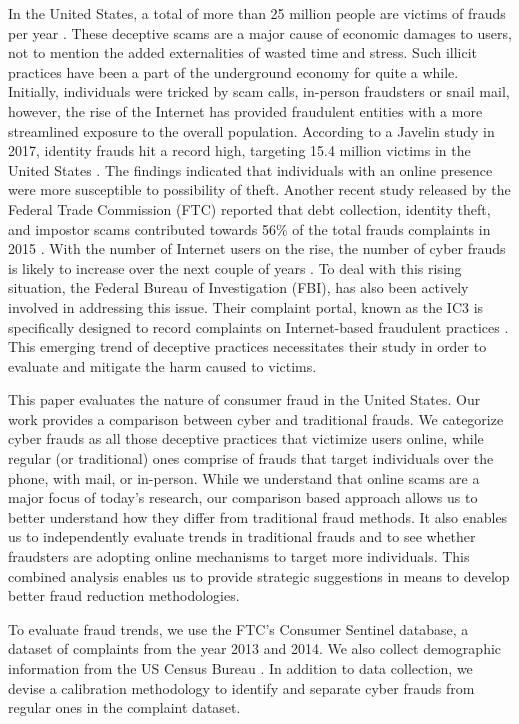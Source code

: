 \documentclass[conference]{IEEEtran}
\begin{document}
In the United States, a total of more than 25 million people are victims of frauds per year \cite{anderson2013consumer}. These deceptive scams are a major cause of economic damages to users, not to mention the added externalities of wasted time and stress. Such illicit practices have been a part of the underground economy for quite a while. Initially, individuals were tricked by scam calls, in-person fraudsters or snail mail, however, the rise of the Internet has provided fraudulent entities with a more streamlined exposure to the overall population. According to a Javelin study in 2017, identity frauds hit a record high, targeting 15.4 million victims in the United States \cite{identiytheftonline}. The findings indicated that individuals with an online presence were more susceptible to possibility of theft. Another recent study released by the  Federal Trade Commission (FTC) reported that debt collection, identity theft, and impostor scams contributed towards 56\% of the total frauds complaints in 2015 \cite{ftcpress2016} . With the number of Internet users on the rise, the number of cyber frauds is likely to increase over the next couple of years \cite{perharassment}. To deal with this rising situation, the Federal Bureau of Investigation (FBI), has also been actively involved in addressing this issue. Their complaint portal, known as the IC3 is specifically designed to record complaints on Internet-based fraudulent practices \cite{fbiic3}. This emerging trend of deceptive practices necessitates their study in order to evaluate and mitigate the harm caused to victims.

This paper evaluates the nature of consumer fraud in the United States. Our work provides a comparison between cyber and traditional frauds. We categorize cyber frauds as all those deceptive practices that victimize users online, while regular (or traditional) ones comprise of frauds that target individuals over the phone, with mail, or in-person. While we understand that online scams \cite{miramirkhani2016dial} are a major focus of today's research, our comparison based approach allows us to better understand how they differ from traditional fraud methods. It also enables us to independently evaluate trends in traditional frauds and to see whether fraudsters are adopting online mechanisms to target more individuals. This combined analysis enables us to provide strategic suggestions in means to develop better fraud reduction methodologies.

To evaluate fraud trends, we use the FTC's Consumer Sentinel database, a dataset of complaints from the year 2013 and 2014. We also collect demographic information from the US Census Bureau \cite{uscensus}. In addition to data collection, we devise a calibration methodology to identify and separate cyber frauds from regular ones in the complaint dataset. 
\end{document}
